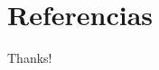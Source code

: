 \documentclass{beamer}
\begin{document}
\section{Referencias}
\begin{frame}[allowframebreaks]
    
    
\end{frame}

\begin{frame}
    \begin{center}
        {\Huge Thanks!}
    \end{center}
\end{frame}
\end{document}
